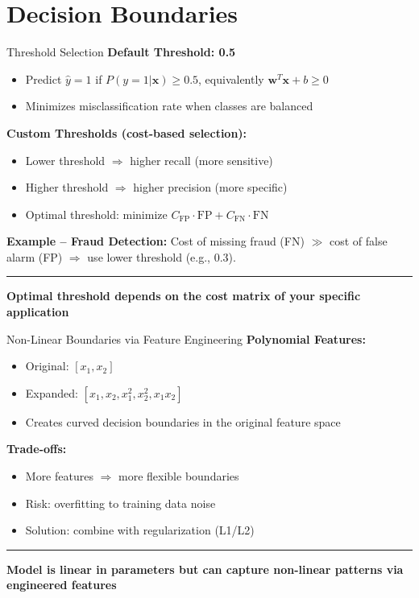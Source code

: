\documentclass[8pt,aspectratio=169]{beamer}
\newcommand{\bottomnote}[1]{%
\vfill
\vspace{-2mm}
\textcolor{mllavender2}{\rule{\textwidth}{0.4pt}}
\vspace{1mm}
\footnotesize
\textbf{#1}
}
\begin{document}
\section{Decision Boundaries}

\begin{frame}[t]{Threshold Selection}
\textbf{Default Threshold: 0.5}
\begin{itemize}
\item Predict $\hat{y} = 1$ if $P(y=1|\mathbf{x}) \geq 0.5$, equivalently $\mathbf{w}^T\mathbf{x} + b \geq 0$
\item Minimizes misclassification rate when classes are balanced
\end{itemize}
\vspace{0.5em}
\textbf{Custom Thresholds (cost-based selection):}
\begin{itemize}
\item Lower threshold $\Rightarrow$ higher recall (more sensitive)
\item Higher threshold $\Rightarrow$ higher precision (more specific)
\item Optimal threshold: minimize $C_{\text{FP}} \cdot \text{FP} + C_{\text{FN}} \cdot \text{FN}$
\end{itemize}
\vspace{0.3em}
\textbf{Example -- Fraud Detection:}
Cost of missing fraud (FN) $\gg$ cost of false alarm (FP) $\Rightarrow$ use lower threshold (e.g., 0.3).
\bottomnote{Optimal threshold depends on the cost matrix of your specific application}
\end{frame}

\begin{frame}[t]{Non-Linear Boundaries via Feature Engineering}
\textbf{Polynomial Features:}
\begin{itemize}
\item Original: $[x_1, x_2]$
\item Expanded: $[x_1, x_2, x_1^2, x_2^2, x_1 x_2]$
\item Creates curved decision boundaries in the original feature space
\end{itemize}
\vspace{0.5em}
\textbf{Trade-offs:}
\begin{itemize}
\item More features $\Rightarrow$ more flexible boundaries
\item Risk: overfitting to training data noise
\item Solution: combine with regularization (L1/L2)
\end{itemize}
\bottomnote{Model is linear in parameters but can capture non-linear patterns via engineered features}
\end{frame}
\end{document}
